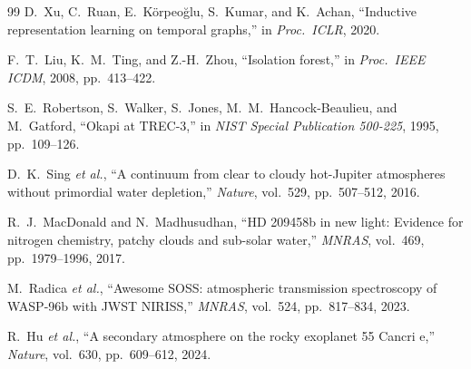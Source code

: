\documentclass[conference]{IEEEtran}
\begin{document}
\begin{thebibliography}{99}
D.~Xu, C.~Ruan, E.~K\"{o}rpeo\u{g}lu, S.~Kumar, and K.~Achan,
``Inductive representation learning on temporal graphs,''
in \textit{Proc.\ ICLR}, 2020.

F.~T.~Liu, K.~M.~Ting, and Z.-H.~Zhou,
``Isolation forest,''
in \textit{Proc.\ IEEE ICDM}, 2008, pp.~413--422.

S.~E.~Robertson, S.~Walker, S.~Jones, M.~M.~Hancock-Beaulieu, and M.~Gatford,
``Okapi at TREC-3,''
in \textit{NIST Special Publication 500-225}, 1995, pp.~109--126.

D.~K.~Sing \textit{et al.},
``A continuum from clear to cloudy hot-Jupiter atmospheres without primordial water depletion,''
\textit{Nature}, vol.~529, pp.~507--512, 2016.

R.~J.~MacDonald and N.~Madhusudhan,
``HD 209458b in new light: Evidence for nitrogen chemistry, patchy clouds and sub-solar water,''
\textit{MNRAS}, vol.~469, pp.~1979--1996, 2017.

M.~Radica \textit{et al.},
``Awesome SOSS: atmospheric transmission spectroscopy of WASP-96b with JWST NIRISS,''
\textit{MNRAS}, vol.~524, pp.~817--834, 2023.

R.~Hu \textit{et al.},
``A secondary atmosphere on the rocky exoplanet 55 Cancri e,''
\textit{Nature}, vol.~630, pp.~609--612, 2024.

\end{thebibliography}
\end{document}
